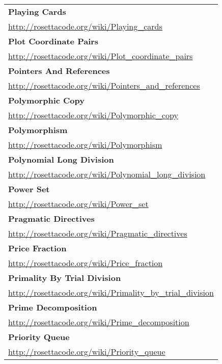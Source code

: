 \begin{longtable}{l}
\textbf{
Playing Cards } \\ \href{http://rosettacode.org/wiki/Playing\_cards}{http://rosettacode.org/wiki/Playing\_cards} \\
\textbf{Plot Coordinate Pairs } \\ \href{http://rosettacode.org/wiki/Plot\_coordinate\_pairs}{http://rosettacode.org/wiki/Plot\_coordinate\_pairs} \\
\textbf{Pointers And References } \\ \href{http://rosettacode.org/wiki/Pointers\_and\_references}{http://rosettacode.org/wiki/Pointers\_and\_references} \\
\textbf{
Polymorphic Copy } \\ \href{http://rosettacode.org/wiki/Polymorphic\_copy}{http://rosettacode.org/wiki/Polymorphic\_copy} \\
\textbf{Polymorphism } \\ \href{http://rosettacode.org/wiki/Polymorphism}{http://rosettacode.org/wiki/Polymorphism} \\
\textbf{Polynomial Long Division } \\ \href{http://rosettacode.org/wiki/Polynomial\_long\_division}{http://rosettacode.org/wiki/Polynomial\_long\_division} \\
\textbf{
Power Set } \\ \href{http://rosettacode.org/wiki/Power\_set}{http://rosettacode.org/wiki/Power\_set} \\
\textbf{Pragmatic Directives } \\ \href{http://rosettacode.org/wiki/Pragmatic\_directives}{http://rosettacode.org/wiki/Pragmatic\_directives} \\
\textbf{Price Fraction } \\ \href{http://rosettacode.org/wiki/Price\_fraction}{http://rosettacode.org/wiki/Price\_fraction} \\
\textbf{
Primality By Trial Division } \\ \href{http://rosettacode.org/wiki/Primality\_by\_trial\_division}{http://rosettacode.org/wiki/Primality\_by\_trial\_division} \\
\textbf{Prime Decomposition } \\ \href{http://rosettacode.org/wiki/Prime\_decomposition}{http://rosettacode.org/wiki/Prime\_decomposition} \\
\textbf{Priority Queue } \\ \href{http://rosettacode.org/wiki/Priority\_queue}{http://rosettacode.org/wiki/Priority\_queue} \\

\end{longtable}
